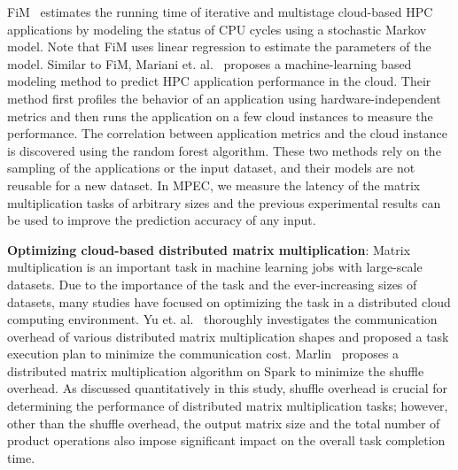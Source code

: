 \documentclass[10pt, conference, compsocconf]{IEEEtran}
\begin{document}
FiM~\cite{fim} estimates the running time of iterative and multistage cloud-based HPC applications by modeling the status of CPU cycles using a stochastic Markov model. Note that FiM uses linear regression to estimate the parameters of the model. Similar to FiM, Mariani et. al.~\cite{hpc-cloud-predict} proposes a machine-learning based modeling method to predict HPC application performance in the cloud. Their method first profiles the behavior of an application using hardware-independent metrics and then runs the application on a few cloud instances to measure the performance. The correlation between application metrics and the cloud instance is discovered using the random forest algorithm. These two methods rely on the sampling of the applications or the input dataset, and their models are not reusable for a new dataset. In MPEC, we measure the latency of the matrix multiplication tasks of arbitrary sizes and the previous experimental results can be used to improve the prediction accuracy of any input.

\textbf{Optimizing cloud-based distributed matrix multiplication}: Matrix multiplication is an important task in machine learning jobs with large-scale datasets. Due to the importance of the task and the ever-increasing sizes of datasets, many studies have focused on optimizing the task in a distributed cloud computing environment. Yu et. al.~\cite{matmult-overhead-profiling} thoroughly investigates the communication overhead of various distributed matrix multiplication shapes and proposed a task execution plan to minimize the communication cost. Marlin~\cite{marlin} proposes a distributed matrix multiplication algorithm on Spark to minimize the shuffle overhead. As discussed quantitatively in this study, shuffle overhead is crucial for determining the performance of distributed matrix multiplication tasks; however, other than the shuffle overhead, the output matrix size and the total number of product operations also impose significant impact on the overall task completion time.
\end{document}
